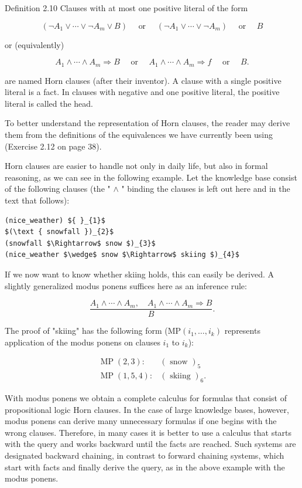 \documentclass[10pt]{book}
\begin{document}
Definition 2.10 Clauses with at most one positive literal of the form

$$
\left(\neg A_{1} \vee \cdots \vee \neg A_{m} \vee B\right) \quad \text { or } \quad\left(\neg A_{1} \vee \cdots \vee \neg A_{m}\right) \quad \text { or } \quad B
$$

or (equivalently)

$$
A_{1} \wedge \cdots \wedge A_{m} \Rightarrow B \quad \text { or } \quad A_{1} \wedge \cdots \wedge A_{m} \Rightarrow f \quad \text { or } \quad B .
$$

are named Horn clauses (after their inventor). A clause with a single positive literal is a fact. In clauses with negative and one positive literal, the positive literal is called the head.

To better understand the representation of Horn clauses, the reader may derive them from the definitions of the equivalences we have currently been using (Exercise 2.12 on page 38).

Horn clauses are easier to handle not only in daily life, but also in formal reasoning, as we can see in the following example. Let the knowledge base consist of the following clauses (the " $\wedge$ " binding the clauses is left out here and in the text that follows):

\begin{verbatim}
(nice_weather) ${ }_{1}$
$(\text { snowfall })_{2}$
(snowfall $\Rightarrow$ snow $)_{3}$
(nice_weather $\wedge$ snow $\Rightarrow$ skiing $)_{4}$
\end{verbatim}

If we now want to know whether skiing holds, this can easily be derived. A slightly generalized modus ponens suffices here as an inference rule:

$$
\frac{A_{1} \wedge \cdots \wedge A_{m}, \quad A_{1} \wedge \cdots \wedge A_{m} \Rightarrow B}{B} .
$$

The proof of "skiing" has the following form ($\mathrm{MP}(i_{1}, \ldots, i_{k})$ represents application of the modus ponens on clauses $i_{1}$ to $i_{k}$):

$$
\begin{array}{ll}
\operatorname{MP}(2,3): & (\text { snow })_{5} \\
\operatorname{MP}(1,5,4): & (\text { skiing })_{6} .
\end{array}
$$

With modus ponens we obtain a complete calculus for formulas that consist of propositional logic Horn clauses. In the case of large knowledge bases, however, modus ponens can derive many unnecessary formulas if one begins with the wrong clauses. Therefore, in many cases it is better to use a calculus that starts with the query and works backward until the facts are reached. Such systems are designated backward chaining, in contrast to forward chaining systems, which start with facts and finally derive the query, as in the above example with the modus ponens.
\end{document}
